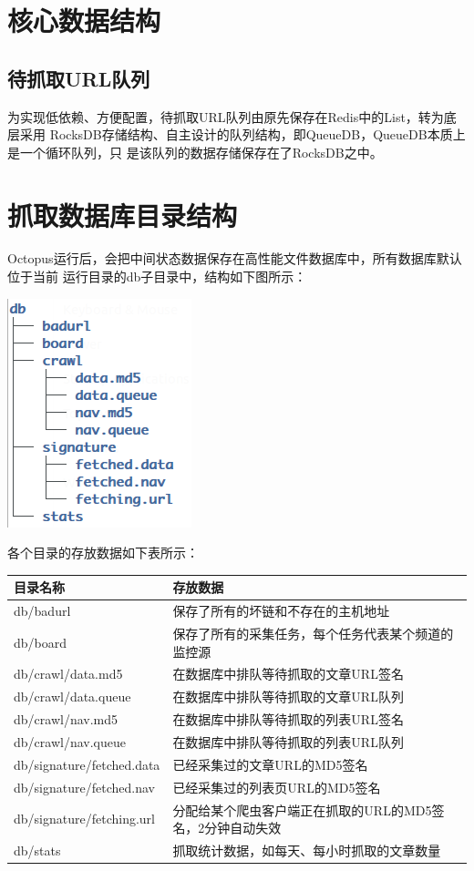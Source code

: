 \section{核心数据结构}

\subsection{待抓取URL队列}

为实现低依赖、方便配置，待抓取URL队列由原先保存在Redis中的List，转为底层采用
RocksDB存储结构、自主设计的队列结构，即QueueDB，QueueDB本质上是一个循环队列，只
是该队列的数据存储保存在了RocksDB之中。

\section{抓取数据库目录结构}

Octopus运行后，会把中间状态数据保存在高性能文件数据库中，所有数据库默认位于当前
运行目录的db子目录中，结构如下图所示：
\begin{center}
  \includegraphics[]{figs/db_tree.png}

  各个目录的存放数据如下表所示：
  \begin{tabular}{| p{} | p{}|}
    \hline
    \rowcolor{red!10}
    目录名称 & 存放数据 \\ \hline
    db/badurl &  保存了所有的坏链和不存在的主机地址 \\ \hline
    db/board & 保存了所有的采集任务，每个任务代表某个频道的监控源 \\ \hline
    db/crawl/data.md5 & 在数据库中排队等待抓取的文章URL签名\\ \hline
    db/crawl/data.queue & 在数据库中排队等待抓取的文章URL队列 \\ \hline
    db/crawl/nav.md5 & 在数据库中排队等待抓取的列表URL签名\\ \hline
    db/crawl/nav.queue & 在数据库中排队等待抓取的列表URL队列\\ \hline
    db/signature/fetched.data & 已经采集过的文章URL的MD5签名 \\ \hline
    db/signature/fetched.nav & 已经采集过的列表页URL的MD5签名 \\ \hline
    db/signature/fetching.url & 分配给某个爬虫客户端正在抓取的URL的MD5签名，2分钟自动失效
    \\ \hline
    db/stats & 抓取统计数据，如每天、每小时抓取的文章数量 \\ \hline
  \end{tabular}
  
\end{center}


